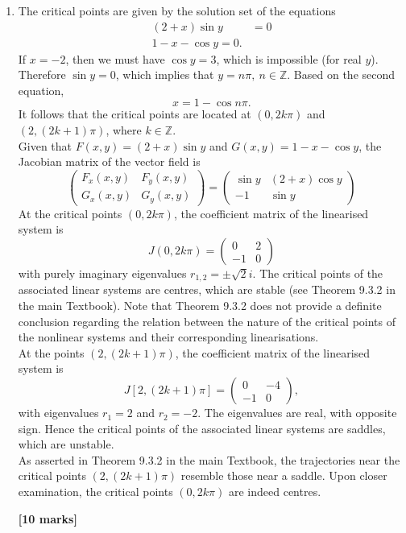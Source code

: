\documentclass[11pt,a4paper]{article}
\newcommand{\mrk}[1]{\hfill\textbf{[#1 marks]}}
\begin{document}
\begin{enumerate}
\begin{align*}
\begin{pmatrix}
				\left(-\frac{1}{2}t + \frac{1}{4}\right)e^t + 2t - 1
			\end{pmatrix}.
		\end{align*}
		\mrk{10}
		\item The critical points are given by the solution set of the equations
		\begin{align*}
			(2 + x) \sin y &= 0\\
			1 - x - \cos y = 0.
		\end{align*}
		If $x = -2$, then we must have $\cos y = 3$, which is impossible (for real $y$). Therefore $\sin y = 0$, which implies that $y = n\pi,\ n \in \mathbb{Z}$. Based on the second equation,
		$$
		x = 1 - \cos n\pi.
		$$
		It follows that the critical points are located at $(0, 2k\pi)$ and $(2,(2k +1)\pi)$, where $k \in \mathbb{Z}$.\\
		Given that $F(x, y) = (2 + x) \sin y$ and $G(x, y) = 1 - x - \cos y$, the Jacobian matrix of the vector field is
		$$
		\begin{pmatrix}
			F_x(x,y) & F_y(x,y)\\
			G_x(x,y) & G_y(x,y)
		\end{pmatrix} =
		\begin{pmatrix}
			\sin y & (2 + x)\cos y\\
			-1 & \sin y
		\end{pmatrix}
		$$
		At the critical points $(0, 2k\pi)$, the coefficient matrix of the linearised system is
		$$
		J(0, 2k\pi) =
		\begin{pmatrix}
			0 & 2\\
			-1 & 0
		\end{pmatrix}
		$$
		with purely imaginary eigenvalues $r_{1,2} = \pm \sqrt{2}i$. The critical points of the associated linear systems are centres, which are stable (see Theorem 9.3.2 in the main Textbook). Note that Theorem 9.3.2 does not provide a definite conclusion regarding the relation between the nature of the critical points of the nonlinear systems and their corresponding linearisations.\\
		At the points $(2,(2k + 1)\pi)$, the coefficient matrix of the linearised system is
		$$
		J[2, (2k+1)\pi] =
		\begin{pmatrix}
			0 & -4\\
			-1 & 0
		\end{pmatrix},
		$$
		with eigenvalues $r_1 = 2$ and $r_2 = -2$. The eigenvalues are real, with opposite sign. Hence the critical points of the associated linear systems are saddles, which are unstable.\\
		As asserted in Theorem 9.3.2 in the main Textbook, the trajectories near the critical points $(2,(2k + 1)\pi)$ resemble those near a saddle. Upon closer examination, the critical points $(0, 2k\pi)$ are indeed centres.\par
		\vspace*{0ex}\mrk{10}
	\end{enumerate}
\end{document}
